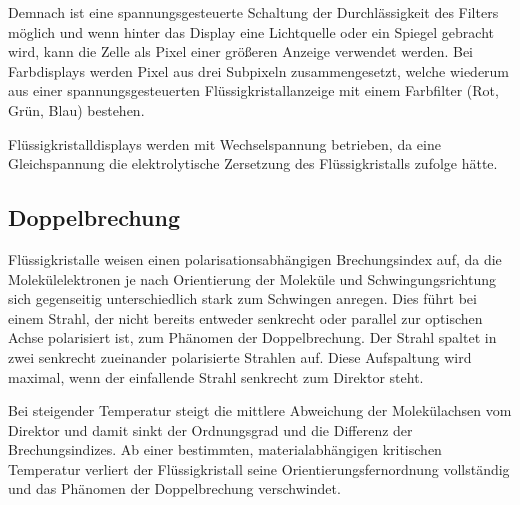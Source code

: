 \documentclass[
	a4paper,
	12pt,
	pagesize,
	ngerman
]{scrartcl}
\begin{document}
	Demnach ist eine spannungsgesteuerte Schaltung der Durchlässigkeit des Filters möglich und wenn hinter das Display eine Lichtquelle oder ein Spiegel gebracht wird, kann die Zelle als Pixel einer größeren Anzeige verwendet werden.
	Bei Farbdisplays werden Pixel aus drei Subpixeln zusammengesetzt, welche wiederum aus einer spannungsgesteuerten Flüssigkristallanzeige mit einem Farbfilter (Rot, Grün, Blau) bestehen. %

	Flüssigkristalldisplays werden mit Wechselspannung betrieben, da eine Gleichspannung die elektrolytische Zersetzung des Flüssigkristalls zufolge hätte. %

\subsection{Doppelbrechung}

	Flüssigkristalle weisen einen polarisationsabhängigen Brechungsindex auf, da die Molekülelektronen je nach Orientierung der Moleküle und Schwingungsrichtung sich gegenseitig unterschiedlich stark zum Schwingen anregen.
	Dies führt bei einem Strahl, der nicht bereits entweder senkrecht oder parallel zur optischen Achse polarisiert ist, zum Phänomen der Doppelbrechung.
	Der Strahl spaltet in zwei senkrecht zueinander polarisierte Strahlen auf.
	Diese Aufspaltung wird maximal, wenn der einfallende Strahl senkrecht zum Direktor steht.

	Bei steigender Temperatur steigt die mittlere Abweichung der Molekülachsen vom Direktor und damit sinkt der Ordnungsgrad und die Differenz der Brechungsindizes.
	Ab einer bestimmten, materialabhängigen kritischen Temperatur verliert der Flüssigkristall seine Orientierungsfernordnung vollständig und das Phänomen der Doppelbrechung verschwindet.
\end{document}
